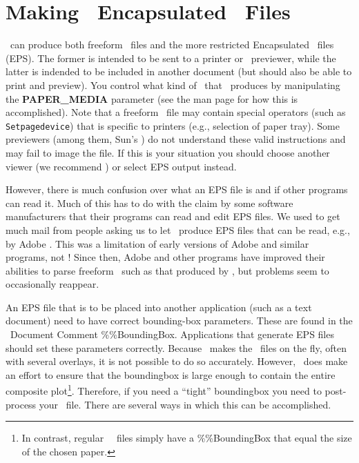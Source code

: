 %
%

\chapter{Making \gmt\ Encapsulated \PS\ Files}
\thispagestyle{headings}

\GMT\ can produce both freeform \PS\ files and the more
restricted Encapsulated \PS\ files (EPS).  The former is
intended to be sent to a printer or \PS\ previewer, while
the latter is indended to be included in another document
(but should also be able to print and preview).  You
control what kind of \PS\ that \GMT\ produces by manipulating
the {\bf PAPER\_MEDIA} parameter (see the  man
page for how this is accomplished).  Note that a freeform \PS\
file may contain special operators (such as \texttt{Setpagedevice})
that is specific to printers (e.g., selection of paper tray).
Some previewers (among them, Sun's ) do not
understand these valid instructions and may fail to image the file.
If this is your situation you should choose another viewer (we
recommend ) or select EPS output instead.

However, there is much confusion over what an EPS file is
and if other programs can read it.  Much of this has to do
with the claim by some software manufacturers that their
programs can read and edit EPS files.  We used to get much
mail from people asking us to let \GMT\ produce EPS files
that can be read, e.g., by Adobe .
This was a limitation of early versions of Adobe  and
similar programs, not \GMT!  Since then, Adobe
\progname{Illustrator} and other programs have
improved their abilities to parse freeform \PS\ such as that produced
by \GMT, but problems seem to occasionally reappear.

An EPS file that is to be placed into another application
(such as a text document) need to have correct bounding-box
parameters.  These are found in the \PS\ Document
Comment \%\%BoundingBox.  Applications that generate EPS
files should set these parameters correctly.  Because \GMT\
makes the \PS\ files on the fly, often with several
overlays, it is not possible to do so accurately.  However,
\GMT\ does make an effort to ensure that the boundingbox is
large enough to contain the entire composite plot\footnote{In contrast,
regular \GMT\ \PS\ files simply have
a \%\%BoundingBox that equal the size of the chosen paper.}.
Therefore, if you need a ``tight'' boundingbox you need to post-process
your \PS\ file.  There are several ways in which this
can be accomplished.

